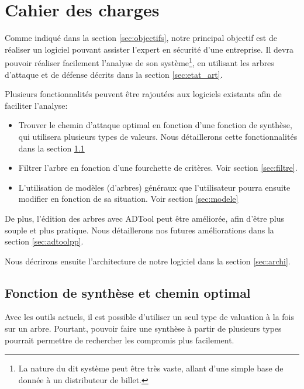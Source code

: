 \section{Cahier des charges}
    \label{sec:cahier}


    Comme indiqué dans la section \ref{sec:objectifs}, notre principal objectif est de réaliser un logiciel pouvant assister l'expert en sécurité d'une entreprise. Il devra pouvoir réaliser facilement l'analyse de son système\footnote{La nature du dit système peut être très vaste, allant d'une simple base de donnée à un distributeur de billet.}, en utilisant les arbres d'attaque et de défense décrits dans la section \ref{sec:etat_art}.

    Plusieurs fonctionnalités peuvent être rajoutées aux logiciels existants afin de faciliter l'analyse:
    \begin{itemize}
        \item Trouver le chemin d'attaque optimal en fonction d'une fonction de synthèse, qui utilisera plusieurs types de valeurs. Nous détaillerons cette fonctionnalités dans la section \ref{sec:fct_synth}
        \item Filtrer l'arbre en fonction d'une fourchette de critères. Voir section \ref{sec:filtre}.
        \item L'utilisation de modèles (d'arbres) généraux que l'utilisateur pourra ensuite modifier en fonction de sa situation. Voir section \ref{sec:modele}
    \end{itemize}

    De plus, l'édition des arbres avec ADTool peut être améliorée, afin d'être plus souple et plus pratique. Nous détaillerons nos futures améliorations dans la section \ref{sec:adtoolpp}.

    Nous décrirons ensuite l'architecture de notre logiciel dans la section \ref{sec:archi}.

    \subsection{Fonction de synthèse et chemin optimal}
        \label{sec:fct_synth}

        Avec les outils actuels, il est possible d'utiliser un seul type de valuation à la fois sur un arbre. Pourtant, pouvoir faire une synthèse à partir de plusieurs types pourrait permettre de rechercher les compromis plus facilement.

